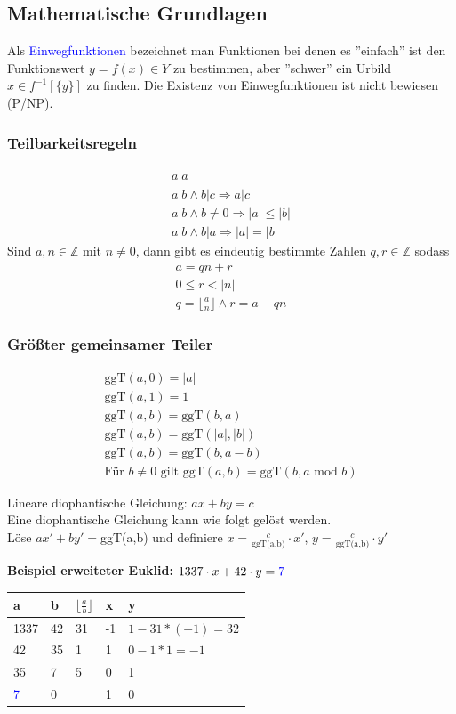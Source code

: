 \documentclass[a4paper,12pt]{article}
\newcommand{\blue}[1]{\textcolor{blue}{#1}}
\begin{document}
\subsection{Mathematische Grundlagen}
Als \blue{Einwegfunktionen} bezeichnet man Funktionen bei denen es ''einfach'' ist den Funktionswert $y = f(x)\in Y$ zu bestimmen, aber ''schwer'' ein Urbild $x\in f^{-1}[\{y\}]$ zu finden. Die Existenz von Einwegfunktionen ist nicht bewiesen (P/NP).
\subsubsection{Teilbarkeitsregeln}
\begin{align}
a | a\\
a | b \wedge b |c \Rightarrow a|c\\
a|b\wedge b\neq 0 \Rightarrow |a|\leq |b|\\
a | b\wedge b|a \Rightarrow |a| = |b|
\end{align}
Sind $a,n\in\mathbb{Z}$ mit $n\neq 0$, dann gibt es eindeutig bestimmte Zahlen $q,r\in\mathbb{Z}$ sodass
\begin{align*}
a= qn+r\\
0\leq r < |n|\\
q = \lfloor \frac{a}{n} \rfloor \wedge r = a -qn
\end{align*}
\subsubsection{Größter gemeinsamer Teiler}
\begin{align}
\textrm{ggT}(a,0)=|a|\\
\textrm{ggT}(a,1)=1\\
\textrm{ggT}(a,b)=\textrm{ggT}(b,a)\\
\textrm{ggT}(a,b)=\textrm{ggT}(|a|,|b|)\\
\textrm{ggT}(a,b)=\textrm{ggT}(b,a-b)\\
\textrm{Für } b\neq 0 \textrm{ gilt } \textrm{ggT}(a,b)=\textrm{ggT}(b,a \textrm{ mod } b)
\end{align}

Lineare diophantische Gleichung: $ax+by=c$\\
Eine diophantische Gleichung kann wie folgt gelöst werden.\\
Löse $ax'+by'=$ggT(a,b) und definiere $x=\frac{c}{\textrm{ggT(a,b)}}\cdot x'$, $y=\frac{c}{\textrm{ggT(a,b)}}\cdot y'$

\textbf{Beispiel erweiteter Euklid:}
$1337\cdot x+42\cdot y=\blue{7}$\\
\begin{tabular}{|l|l|l|l|l|}
a & b & $\lfloor \frac{a}{b} \rfloor$ & x & y\\
\hline
1337 & 42 & 31 & -1 & $1-31*(-1)=32$\\
\hline
42 & 35 & 1 & 1 & $0-1*1=-1$\\
\hline
35 & 7 & 5 & 0 & 1\\
\hline
\blue{7} & 0 & & 1 & 0
\end{tabular}\\
\end{document}
